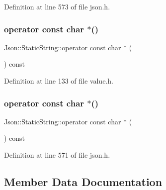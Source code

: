 Definition at line 573 of file json.\+h.

\hypertarget{class_json_1_1_static_string_a256a6cc0c630aef670848a0f11707b62}{}\label{class_json_1_1_static_string_a256a6cc0c630aef670848a0f11707b62} 
\subsubsection{\texorpdfstring{operator const char $\ast$()}{operator const char *()}\hspace{0.1cm}{\footnotesize\ttfamily [1/2]}}
{\footnotesize\ttfamily Json\+::\+Static\+String\+::operator const char $\ast$ (\begin{DoxyParamCaption}{ }\end{DoxyParamCaption}) const\hspace{0.3cm}{\ttfamily [inline]}}



Definition at line 133 of file value.\+h.

\hypertarget{class_json_1_1_static_string_a256a6cc0c630aef670848a0f11707b62}{}\label{class_json_1_1_static_string_a256a6cc0c630aef670848a0f11707b62} 
\subsubsection{\texorpdfstring{operator const char $\ast$()}{operator const char *()}\hspace{0.1cm}{\footnotesize\ttfamily [2/2]}}
{\footnotesize\ttfamily Json\+::\+Static\+String\+::operator const char $\ast$ (\begin{DoxyParamCaption}{ }\end{DoxyParamCaption}) const\hspace{0.3cm}{\ttfamily [inline]}}



Definition at line 571 of file json.\+h.



\subsection{Member Data Documentation}
\hypertarget{class_json_1_1_static_string_add9eec7693057fa981b4f0f454dc2aee}{}\label{class_json_1_1_static_string_add9eec7693057fa981b4f0f454dc2aee} 
